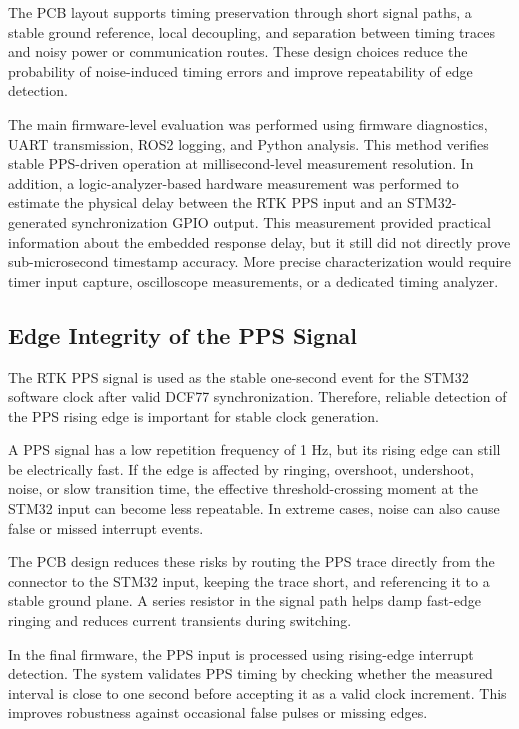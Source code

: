 The PCB layout supports timing preservation through short signal paths, a stable ground reference, local decoupling, and separation between timing traces and noisy power or communication routes. These design choices reduce the probability of noise-induced timing errors and improve repeatability of edge detection.

The main firmware-level evaluation was performed using firmware diagnostics, UART transmission, ROS2 logging, and Python analysis. This method verifies stable PPS-driven operation at millisecond-level measurement resolution. In addition, a logic-analyzer-based hardware measurement was performed to estimate the physical delay between the RTK PPS input and an STM32-generated synchronization GPIO output. This measurement provided practical information about the embedded response delay, but it still did not directly prove sub-microsecond timestamp accuracy. More precise characterization would require timer input capture, oscilloscope measurements, or a dedicated timing analyzer.

\subsection{Edge Integrity of the PPS Signal}

The RTK PPS signal is used as the stable one-second event for the STM32 software clock after valid DCF77 synchronization. Therefore, reliable detection of the PPS rising edge is important for stable clock generation.

A PPS signal has a low repetition frequency of 1 Hz, but its rising edge can still be electrically fast. If the edge is affected by ringing, overshoot, undershoot, noise, or slow transition time, the effective threshold-crossing moment at the STM32 input can become less repeatable. In extreme cases, noise can also cause false or missed interrupt events.

The PCB design reduces these risks by routing the PPS trace directly from the connector to the STM32 input, keeping the trace short, and referencing it to a stable ground plane. A series resistor in the signal path helps damp fast-edge ringing and reduces current transients during switching.

In the final firmware, the PPS input is processed using rising-edge interrupt detection. The system validates PPS timing by checking whether the measured interval is close to one second before accepting it as a valid clock increment. This improves robustness against occasional false pulses or missing edges.

